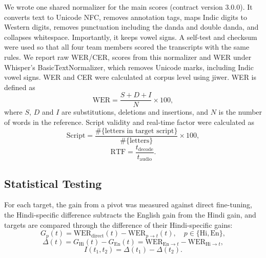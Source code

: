 \documentclass[conference]{IEEEtran}
\begin{document}
We wrote one shared normalizer for the main scores (contract version
3.0.0). It converts text to Unicode NFC, removes annotation tags, maps
Indic digits to Western digits, removes punctuation including the danda
and double danda, and collapses whitespace. Importantly, it keeps vowel
signs. A self-test and checksum were used so that all four team members
scored the transcripts with the same rules. We report raw WER/CER,
scores from this normalizer and WER under Whisper's BasicTextNormalizer,
which removes Unicode marks, including Indic vowel signs. WER and CER
were calculated at corpus level using jiwer. WER is defined as
\begin{equation}
\mathrm{WER}=\frac{S+D+I}{N}\times100,
\label{eq:wer}
\end{equation}
where $S$, $D$ and $I$ are substitutions, deletions and insertions,
and $N$ is the number of words in the reference. Script validity and
real-time factor were calculated as
\begin{equation}
\mathrm{Script}=\frac{\#\{\text{letters in target script}\}}
{\#\{\text{letters}\}}\times100,
\label{eq:script}
\end{equation}
\begin{equation}
\mathrm{RTF}=\frac{t_{\mathrm{decode}}}{t_{\mathrm{audio}}}.
\label{eq:rtf}
\end{equation}

\subsection{Statistical Testing}

For each target, the gain from a pivot was measured against direct
fine-tuning, the Hindi-specific difference subtracts the English gain
from the Hindi gain, and targets are compared through the difference of
their Hindi-specific gains:
\begin{equation}
G_p(t)=\mathrm{WER}_{\mathrm{direct}}(t)-
\mathrm{WER}_{p\rightarrow t}(t),\quad
p\in\{\mathrm{Hi},\mathrm{En}\},
\label{eq:gain}
\end{equation}
\begin{equation}
\Delta(t)=G_{\mathrm{Hi}}(t)-G_{\mathrm{En}}(t)
=\mathrm{WER}_{\mathrm{En}\rightarrow t}
-\mathrm{WER}_{\mathrm{Hi}\rightarrow t},
\label{eq:delta}
\end{equation}
\begin{equation}
I(t_1,t_2)=\Delta(t_1)-\Delta(t_2).
\label{eq:interaction}
\end{equation}
\end{document}
